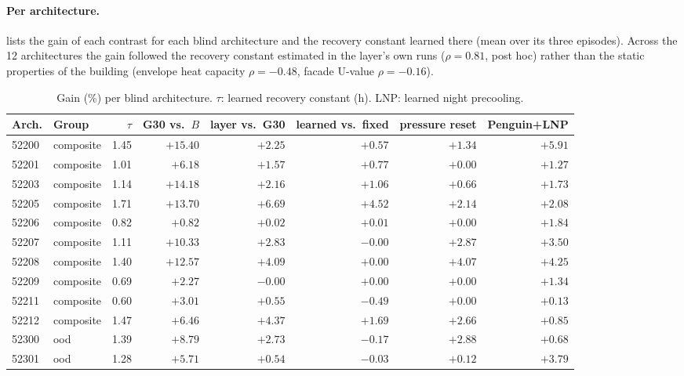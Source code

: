 \paragraph{Per architecture.}  lists the gain of each contrast for each blind architecture and the
recovery constant learned there (mean over its three episodes).
Across the 12 architectures the gain followed the recovery constant estimated in the layer's own runs ($\rho = 0.81$, post
hoc) rather than the static properties of the building (envelope heat capacity $\rho = -0.48$, facade U-value $\rho = -0.16$).
\begin{table}[!htbp]
\centering
\setlength{\tabcolsep}{4pt}
\caption{Gain (\%) per blind architecture. $\tau$: learned recovery constant (h). LNP: learned night precooling.}
\label{tab:perarch}
\footnotesize
\begin{tabular}{llrrrrrr}
\toprule
Arch. & Group & $\tau$ & G30 vs.\ $B$ & layer vs.\ G30 & learned vs.\ fixed & pressure reset & Penguin+LNP\\
\midrule
52200 & composite & 1.45 & $+15.40$ & $+2.25$ & $+0.57$ & $+1.34$ & $+5.91$\\
52201 & composite & 1.01 & $+6.18$ & $+1.57$ & $+0.77$ & $+0.00$ & $+1.27$\\
52203 & composite & 1.14 & $+14.18$ & $+2.16$ & $+1.06$ & $+0.66$ & $+1.73$\\
52205 & composite & 1.71 & $+13.70$ & $+6.69$ & $+4.52$ & $+2.14$ & $+2.08$\\
52206 & composite & 0.82 & $+0.82$ & $+0.02$ & $+0.01$ & $+0.00$ & $+1.84$\\
52207 & composite & 1.11 & $+10.33$ & $+2.83$ & $-0.00$ & $+2.87$ & $+3.50$\\
52208 & composite & 1.40 & $+12.57$ & $+4.09$ & $+0.00$ & $+4.07$ & $+4.25$\\
52209 & composite & 0.69 & $+2.27$ & $-0.00$ & $+0.00$ & $+0.00$ & $+1.34$\\
52211 & composite & 0.60 & $+3.01$ & $+0.55$ & $-0.49$ & $+0.00$ & $+0.13$\\
52212 & composite & 1.47 & $+6.46$ & $+4.37$ & $+1.69$ & $+2.66$ & $+0.85$\\
52300 & ood & 1.39 & $+8.79$ & $+2.73$ & $-0.17$ & $+2.88$ & $+0.68$\\
52301 & ood & 1.28 & $+5.71$ & $+0.54$ & $-0.03$ & $+0.12$ & $+3.79$\\
\bottomrule
\end{tabular}
\end{table}

